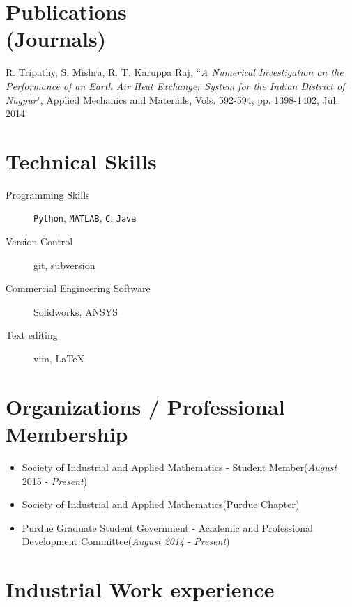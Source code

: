 \documentclass[margin,line,a4paper]{resume}
\begin{document}
\begin{resume}
\section{\mysidestyle Publications \\ (Journals)}
\begin{description}
\item R. Tripathy, S. Mishra, R. T. Karuppa Raj, ``\textit{A Numerical Investigation on the Performance of an Earth Air Heat Exchanger System for the Indian District of Nagpur}", Applied Mechanics and Materials, Vols. 592-594, pp. 1398-1402, Jul. 2014
\end{description}




\section{\mysidestyle Technical Skills}
\begin{description}
\item[Programming Skills] \texttt{Python}, \texttt{MATLAB}, \texttt{C}, \texttt{Java}
\item[Version Control] git, subversion 
\item[Commercial Engineering Software] Solidworks, ANSYS
\item[Text editing] vim, \LaTeX
\end{description}



\section{\mysidestyle Organizations / Professional Membership}
\begin{itemize}
\item Society of Industrial and Applied Mathematics - Student Member(\textit{August} 2015 - \textit{Present})
\item Society of Industrial and Applied Mathematics(Purdue Chapter) 
\item Purdue Graduate Student Government - Academic and Professional Development Committee(\textit{August 2014} - \textit{Present})
\end{itemize}



\section{\mysidestyle Industrial Work experience}\vspace{1mm}
\begin{description}
   

\end{description}
\end{resume}
\end{document}
